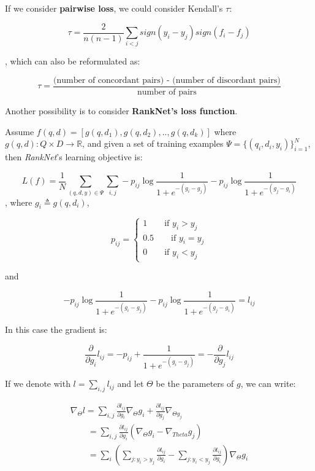 If we consider \textbf{pairwise loss}, we could consider Kendall's $\tau$:

$$
\tau = \frac{2}{n(n-1)} \sum_{i<j} sign(y_i - y_j) sign(f_i - f_j)
$$

, which can also be reformulated as:

$$
\tau = \frac{\text{(number of concordant pairs) - (number of discordant pairs)}}{\text{number of pairs}}
$$


Another possibility is to consider \textbf{RankNet's loss function}. 

Assume $f(q,d) = [g(q,d_1), g(q,d_2), .., g(q,d_k)]$ where $g(q,d): Q \times D \to \mathbb{R}$, and given a set of training examples $\Psi = \{ (q_i, d_i, y_i) \}_{i = 1}^N$, then \textit{RankNet}'s learning objective is:

$$
L(f) = \frac{1}{N} \sum_{(q,d,y) \in \Psi} \sum_{i,j} -p_{ij} \log \frac{1}{1 + e^{-(g_i - g_j)}} - p_{ij} \log \frac{1}{1 + e^{-(g_j - g_i)}}
$$
, where $g_i \triangleq g(q,d_i)$, 

$$
p_{ij} = \begin{cases}
	1 \qquad \text{if } y_i > y_j\\
	0.5 \qquad \text{if } y_i = y_j\\
        0 \qquad \text{if } y_i < y_j
	\end{cases}
$$

and 

$$
-p_{ij} \log \frac{1}{1 + e^{-(g_i - g_j)}} - p_{ij} \log \frac{1}{1 + e^{-(g_j - g_i)}} = l_{ij}
$$

In this case the gradient is:

$$
\frac{\partial}{\partial g_i} l_{ij} = -p_{ij} + \frac{1}{1 + e^{-(g_i -g_j)}} = -\frac{\partial}{\partial g_j} l_{ij}
$$

If we denote with $l = \sum_{i,j} l_{ij}$ and let $\Theta$ be the parameters of $g$, we can write:

\begin{equation*}
\begin{split}
\nabla_{\Theta} l = \sum_{i,j} \frac{\partial l_{ij}}{\partial g_i} \nabla_{\Theta} g_i + \frac{\partial l_{ij}}{\partial g_j} \nabla_{\Theta g_j}\\
\qquad = \sum_{i,j} \frac{\partial l_{ij}}{\partial g_i} (\nabla_{\Theta} g_i - \nabla_{Theta} g_j)\\
\qquad = \sum_{i} \left(  \sum_{j : y_i > y_j} \frac{\partial l_{ij}}{\partial g_i} - \sum_{j : y_i < y_j} \frac{\partial l_{ij}}{\partial g_i} \right) \nabla_{\Theta} g_i
\end{split}
\end{equation*}

